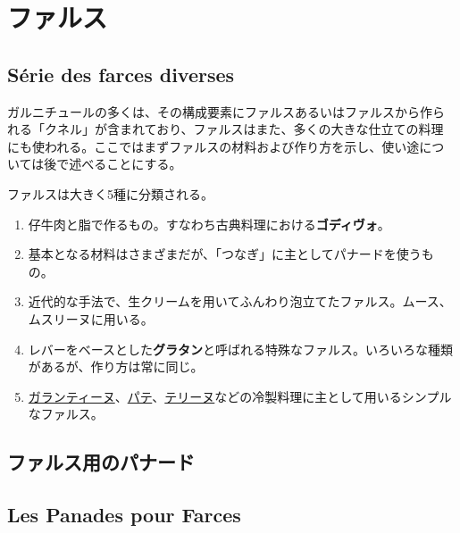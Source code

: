 \hypertarget{ux30d5ux30a1ux30ebux30b9}{%
\section{ファルス}\label{ux30d5ux30a1ux30ebux30b9}}

\hypertarget{suxe9rie-des-farces-diverses}{%
\subsection{Série des farces
diverses}\label{suxe9rie-des-farces-diverses}}

 

ガルニチュールの多くは、その構成要素にファルスあるいはファルスから作ら
れる「クネル」が含まれており、ファルスはまた、多くの大きな仕立ての料理
にも使われる。ここではまずファルスの材料および作り方を示し、使い途につ
いては後で述べることにする。

ファルスは大きく5種に分類される。

\begin{enumerate}
\def\labelenumi{\arabic{enumi}.}
\item
  仔牛肉と脂で作るもの。すなわち古典料理における\textbf{ゴディヴォ}。
\item
  基本となる材料はさまざまだが、「つなぎ」に主としてパナードを使うもの。
\item
  近代的な手法で、生クリームを用いてふんわり泡立てたファルス。ムース、ムスリーヌに用いる。
\item
  レバーをベースとした\textbf{グラタン}と呼ばれる特殊なファルス。いろいろな種類があるが、作り方は常に同じ。
\item
  \protect\hyperlink{}{ガランティーヌ}、\protect\hyperlink{}{パテ}、\protect\hyperlink{}{テリーヌ}などの冷製料理に主として用いるシンプルなファルス。
\end{enumerate}

\hypertarget{ux30d5ux30a1ux30ebux30b9ux7528ux306eux30d1ux30caux30fcux30c9}{%
\subsection{ファルス用のパナード}\label{ux30d5ux30a1ux30ebux30b9ux7528ux306eux30d1ux30caux30fcux30c9}}

\vspace*{-1.7\zw}

\hypertarget{les-panades-pour-farces}{%
\subsection{Les Panades pour Farces}\label{les-panades-pour-farces}}

